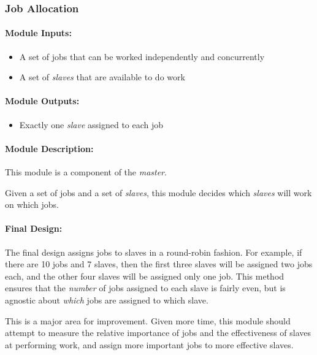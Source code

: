 \documentclass[pdftex,12pt,a4paper]{article}
\begin{document}
\subsubsection{Job Allocation}

\paragraph{Module Inputs:}
\begin{itemize}
\item A set of jobs that can be worked independently and concurrently
\item A set of \emph{slaves} that are available to do work
\end{itemize}

\paragraph{Module Outputs:}
\begin{itemize}
\item Exactly one \emph{slave} assigned to each job
\end{itemize}

\paragraph{Module Description:\\}
This module is a component of the \emph{master}.

Given a set of jobs and a set of \emph{slaves}, this module decides which \emph{slaves} will work on which jobs.

\paragraph{Final Design:\\}
The final design assigns jobs to slaves in a round-robin fashion. For example, if there are 10 jobs and 7 slaves, then the first three slaves will be assigned two jobs each, and the other four slaves will be assigned only one job. This method ensures that the \emph{number} of jobs assigned to each slave is fairly even, but is agnostic about \emph{which} jobs are assigned to which slave.

This is a major area for improvement. Given more time, this module should attempt to measure the relative importance of jobs and the effectiveness of slaves at performing work, and assign more important jobs to more effective slaves.
\end{document}

